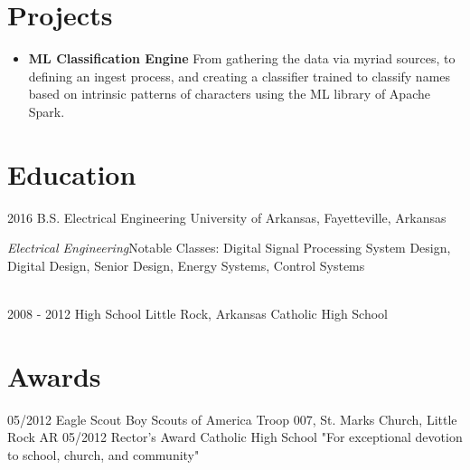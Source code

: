 \documentclass[]{friggeri-cv}
\begin{document}
\section{Projects}
\begin{itemize}
  \item
    {\textbf{ML Classification Engine} From gathering the data via myriad sources, to defining an ingest process, and creating a classifier trained to classify names based on intrinsic patterns of characters using the ML library of Apache Spark.}
\end{itemize}

\section{Education}
\begin{entrylist}
  \entry
    {2016}
    {B.S. Electrical Engineering}
    {University of Arkansas, Fayetteville, Arkansas}
    {\raggedright{\textit{Electrical Engineering}}\break Notable Classes: Digital Signal Processing System Design, Digital Design, Senior Design, Energy Systems, Control Systems\\}
    \\
  \entry
    {2008 - 2012}
    {High School}
    {Little Rock, Arkansas}
    {Catholic High School}
\end{entrylist}

\section{Awards}
\begin{entrylist}
  \entry
    {05/2012}
    {Eagle Scout}
    {Boy Scouts of America}
    {Troop 007, St. Marks Church, Little Rock AR}
  \entry
    {05/2012}
    {Rector's Award}
    {Catholic High School}
    {"For exceptional devotion to school, church, and community"}
\end{entrylist}
\end{document}
